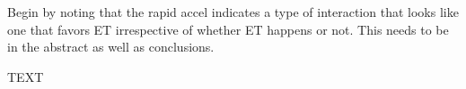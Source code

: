 \documentclass[wcd,manuscript]{copernicus}
\begin{document}
Begin by noting that the rapid accel indicates a type of interaction that looks like one that favors ET irrespective of whether ET happens or not. This needs to be in the abstract as well as conclusions.




\conclusions  %
TEXT











\appendix
\section{}    %





\noappendix       %



\end{document}
